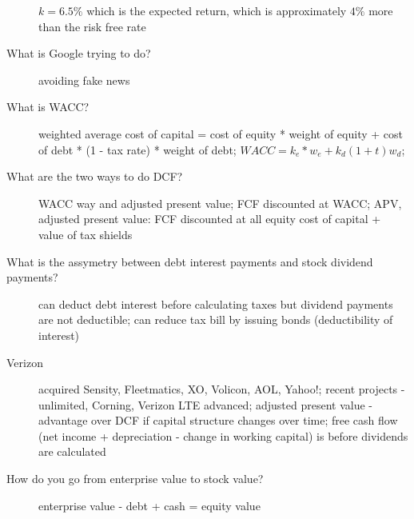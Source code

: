 \documentclass[11pt]{article}
\begin{document}
\begin{description}
  $k = 6.5\%$ which is the expected return, which is approximately $4\%$ more than the risk free rate
\item[What is Google trying to do?]
  avoiding fake news
\item[What is WACC?]
  weighted average cost of capital = cost of equity * weight of equity + cost of debt * (1 - tax rate) * weight of debt;
  $WACC = k_e*w_e + k_d (1 + t) w_d$;
\item[What are the two ways to do DCF?]
  WACC way and adjusted present value;
  FCF discounted at WACC;
  APV, adjusted present value: FCF discounted at all equity cost of capital + value of tax shields
\item[What is the assymetry between debt interest payments and stock dividend payments?]
  can deduct debt interest before calculating taxes but dividend payments are not deductible;
  can reduce tax bill by issuing bonds (deductibility of interest)
\item[Verizon]
  acquired Sensity, Fleetmatics, XO, Volicon, AOL, Yahoo!;
  recent projects - unlimited, Corning, Verizon LTE advanced;
  adjusted present value - advantage over DCF if capital structure changes over time;
  free cash flow (net income + depreciation - change in working capital) is before dividends are calculated
\item[How do you go from enterprise value to stock value?]
  enterprise value - debt + cash = equity value
\end{description}
\end{document}
